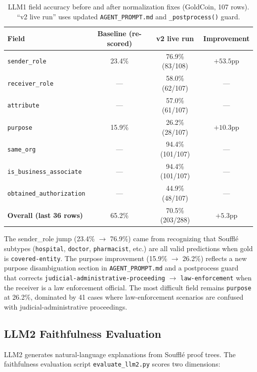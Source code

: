 \documentclass[11pt,letterpaper]{article}
\begin{document}
\begin{appendices}
\begin{table}[H]
\centering
\begin{tabular}{lccc}
\toprule
\textbf{Field} & \textbf{Baseline (re-scored)} & \textbf{v2 live run} & \textbf{Improvement} \\
\midrule
\texttt{sender\_role}            & 23.4\%  & 76.9\% (83/108) & $+53.5$pp \\
\texttt{receiver\_role}          & ---     & 58.0\% (62/107) & --- \\
\texttt{attribute}               & ---     & 57.0\% (61/107) & --- \\
\texttt{purpose}                 & 15.9\%  & 26.2\% (28/107) & $+10.3$pp \\
\texttt{same\_org}               & ---     & 94.4\% (101/107) & --- \\
\texttt{is\_business\_associate} & ---     & 94.4\% (101/107) & --- \\
\texttt{obtained\_authorization} & ---     & 44.9\% (48/107) & --- \\
\textbf{Overall (last 36 rows)}  & 65.2\%  & 70.5\% (203/288) & $+5.3$pp \\
\bottomrule
\end{tabular}
\caption{LLM1 field accuracy before and after normalization fixes (GoldCoin, 107 rows). ``v2 live run'' uses updated \texttt{AGENT\_PROMPT.md} and \texttt{\_postprocess()} guard.}
\end{table}

The sender\_role jump (23.4\% $\to$ 76.9\%) came from recognizing that Souffl\'{e} subtypes (\texttt{hospital}, \texttt{doctor}, \texttt{pharmacist}, etc.) are all valid predictions when gold is \texttt{covered-entity}. The purpose improvement (15.9\% $\to$ 26.2\%) reflects a new purpose disambiguation section in \texttt{AGENT\_PROMPT.md} and a postprocess guard that corrects \texttt{judicial-administrative-proceeding} $\to$ \texttt{law-enforcement} when the receiver is a law enforcement official. The most difficult field remains \texttt{purpose} at 26.2\%, dominated by 41 cases where law-enforcement scenarios are confused with judicial-administrative proceedings.

\subsection{LLM2 Faithfulness Evaluation}

LLM2 generates natural-language explanations from Souffl\'{e} proof trees. The faithfulness evaluation script \texttt{evaluate\_llm2.py} scores two dimensions:


\end{appendices}
\end{document}
